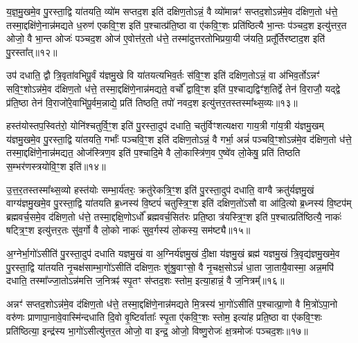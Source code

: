 य॒ज्ञ॒मु॒खमे॒व पु॒रस्ता॒द्वि या॑तयति॒ व्यो॑म सप्तद॒श इति॑ दक्षिण॒तो\-ऽन्नं॒ वै व्यो॑मान्नꣳ॑ सप्तद॒शो\-ऽन्न॑मे॒व द॑क्षिण॒तो ध॑त्ते॒ तस्मा॒द्दक्षि॑णे॒नान्न॑मद्यते ध॒रुण॑ एकवि॒ꣳ॒श इति॑ प॒श्चात्प्र॑ति॒ष्ठा वा ए॑कवि॒ꣳ॒शः प्रति॑ष्ठित्यै भा॒न्तः प॑ञ्चद॒श इत्यु॑त्तर॒त ओजो॒ वै भा॒न्त ओजः॑ पञ्चद॒श ओज॑ ए॒वोत्त॑र॒तो ध॑त्ते॒ तस्मा॑दुत्तरतोभिप्रया॒यी ज॑यति॒ प्रतू᳚र्तिरष्टाद॒श इति॑ पु॒रस्ता᳚त्॥१२॥

उप॑ दधाति॒ द्वौ त्रि॒वृता॑वभिपू॒र्वं य॑ज्ञमु॒खे वि या॑तयत्यभिव॒र्तः स॑वि॒ꣳ॒श इति॑ दक्षिण॒तो\-ऽन्नं॒ वा अ॑भिव॒र्तो\-ऽन्नꣳ॑ सवि॒ꣳ॒शो\-ऽन्न॑मे॒व द॑क्षिण॒तो ध॑त्ते॒ तस्मा॒द्दक्षि॑णे॒नान्न॑मद्यते॒ वर्चो᳚ द्वावि॒ꣳ॒श इति॑ प॒श्चाद्यद्विꣳ॑श॒तिर्द्वे तेन॑ वि॒राजौ॒ यद्द्वे प्र॑ति॒ष्ठा तेन॑ वि॒राजो॑रे॒वाभि॑पू॒र्वम॒न्नाद्ये॒ प्रति॑ तिष्ठति॒ तपो॑ नवद॒श इत्यु॑त्तर॒तस्तस्मा᳚थ्स॒व्यः॥१३॥

हस्त॑योस्तप॒स्वित॑रो॒ योनि॑श्चतुर्वि॒ꣳ॒श इति॑ पु॒रस्ता॒दुप॑ दधाति॒ चतु॑र्विꣳशत्यक्षरा गाय॒त्री गा॑य॒त्री य॑ज्ञमु॒खम् य॑ज्ञमु॒खमे॒व पु॒रस्ता॒द्वि या॑तयति॒ गर्भाः᳚ पञ्चवि॒ꣳ॒श इति॑ दक्षिण॒तो\-ऽन्नं॒ वै गर्भा॒ अन्नं॑ पञ्चवि॒ꣳ॒शो\-ऽन्न॑मे॒व द॑क्षिण॒तो ध॑त्ते॒ तस्मा॒द्दक्षि॑णे॒नान्न॑मद्यत॒ ओज॑स्त्रिण॒व इति॑ प॒श्चादि॒मे वै लो॒कास्त्रि॑ण॒व ए॒ष्वे॑व लो॒केषु॒ प्रति॑ तिष्ठति स॒म्भर॑णस्त्रयोवि॒ꣳ॒श इति॑॥१४॥

उ॒त्त॒र॒तस्तस्मा᳚थ्स॒व्यो हस्त॑योः सम्भा॒र्य॑तरः॒ क्रतु॑रेकत्रि॒ꣳ॒श इति॑ पु॒रस्ता॒दुप॑ दधाति॒ वाग्वै क्रतु॑र्यज्ञमु॒खं वाग्य॑ज्ञमु॒खमे॒व पु॒रस्ता॒द्वि या॑तयति ब्र॒ध्नस्य॑ वि॒ष्टपं॑ चतुस्त्रि॒ꣳ॒श इति॑ दक्षिण॒तो॑\-ऽसौ वा आ॑दि॒त्यो ब्र॒ध्नस्य॑ वि॒ष्टप॑म् ब्रह्मवर्च॒समे॒व द॑क्षिण॒तो ध॑त्ते॒ तस्मा॒द्दक्षि॒णो\-ऽर्धो᳚ ब्रह्मवर्च॒सित॑रः प्रति॒ष्ठा त्र॑यस्त्रि॒ꣳ॒श इति॑ प॒श्चात्प्रति॑ष्ठित्यै॒ नाकः॑ षट्त्रि॒ꣳ॒श इत्यु॑त्तर॒तः सु॑व॒र्गो वै लो॒को नाकः॑ सुव॒र्गस्य॑ लो॒कस्य॒ सम॑ष्ट्यै॥१५॥

{\anuvakamend[{वै त्रि॒वृदिति॑ पु॒रस्ता᳚थ्स॒व्यस्त्र॑योवि॒ꣳ॒श इति॑ सुव॒र्गो वै पञ्च॑ च॥३॥ आ॒शुर्व्यो॑म ध॒रुणो॑ भा॒न्तः प्रतू᳚र्तिरभिव॒र्तो वर्च॒स्तपो॒ योनि॒र्गर्भा॒ ओजः॑ स॒म्भर॑णः॒ क्रतु॑र्ब्र॒ध्नस्य॑ प्रति॒ष्ठा नाक॒ष्षोड॑श॥}]}

अ॒ग्नेर्भा॒गो॑\-ऽसीति॑ पु॒रस्ता॒दुप॑ दधाति यज्ञमु॒खं वा अ॒ग्निर्य॑ज्ञमु॒खं दी॒क्षा य॑ज्ञमु॒खं ब्रह्म॑ यज्ञमु॒खं त्रि॒वृद्य॑ज्ञमु॒खमे॒व पु॒रस्ता॒द्वि या॑तयति नृ॒चक्ष॑साम्भा॒गो॑\-ऽसीति॑ दक्षिण॒तः शु॑श्रु॒वाꣳसो॒ वै नृ॒चक्ष॒सो\-ऽन्नं॑ धा॒ता जा॒तायै॒वास्मा॒ अन्न॒मपि॑ दधाति॒ तस्मा᳚ज्जा॒तो\-ऽन्न॑मत्ति ज॒नित्रꣴ॑ स्पृ॒तꣳ स॑प्तद॒शः स्तोम॒ इत्या॒हान्नं॒ वै ज॒नित्रम्᳚॥१६॥

अन्नꣳ॑ सप्तद॒शो\-ऽन्न॑मे॒व द॑क्षिण॒तो ध॑त्ते॒ तस्मा॒द्दक्षि॑णे॒नान्न॑मद्यते मि॒त्रस्य॑ भा॒गो॑\-ऽसीति॑ प॒श्चात्प्रा॒णो वै मि॒त्रो॑\-ऽपा॒नो वरु॑णः प्राणापा॒नावे॒वास्मि॑न्दधाति दि॒वो वृ॒ष्टिर्वाताः᳚ स्पृ॒ता ए॑कवि॒ꣳ॒शः स्तोम॒ इत्या॑ह प्रति॒ष्ठा वा ए॑कवि॒ꣳ॒शः प्रति॑ष्ठित्या॒ इन्द्र॑स्य भा॒गो॑\-ऽसीत्यु॑त्तर॒त ओजो॒ वा इन्द्र॒ ओजो॒ विष्णु॒रोजः॑ क्ष॒त्रमोजः॑ पञ्चद॒शः॥१७॥

